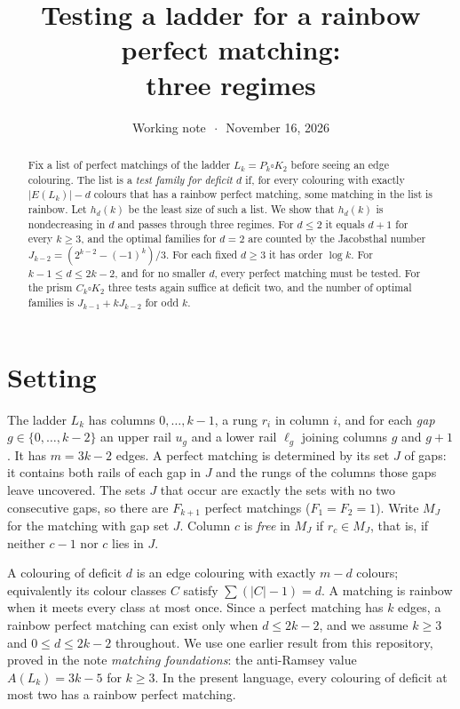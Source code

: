 \documentclass[11pt]{article}
\title{\LARGE\bfseries Testing a ladder for a rainbow perfect matching:\\ three regimes}
\author{}
\date{Working note \(\,\cdot\,\) November 16, 2026}
\theoremstyle{remark}
\begin{document}
\maketitle

\begin{abstract}\noindent
Fix a list of perfect matchings of the ladder \(L_k=P_k\square K_2\) before
seeing an edge colouring. The list is a \emph{test family for deficit \(d\)}
if, for every colouring with exactly \(|E(L_k)|-d\) colours that has a
rainbow perfect matching, some matching in the list is rainbow. Let
\(h_d(k)\) be the least size of such a list. We show that \(h_d(k)\) is
nondecreasing in \(d\) and passes through three regimes. For \(d\le 2\) it
equals \(d+1\) for every \(k\ge3\), and the optimal families for \(d=2\) are
counted by the Jacobsthal number \(J_{k-2}=(2^{k-2}-(-1)^{k})/3\). For each
fixed \(d\ge3\) it has order \(\log k\). For \(k-1\le d\le 2k-2\), and for no
smaller \(d\), every perfect matching must be tested. For the prism
\(C_k\square K_2\) three tests again suffice at deficit two, and the number
of optimal families is \(J_{k-1}+kJ_{k-2}\) for odd \(k\).
\end{abstract}

\section{Setting}
The ladder \(L_k\) has columns \(0,\dots,k-1\), a rung \(r_i\) in column
\(i\), and for each \emph{gap} \(g\in\{0,\dots,k-2\}\) an upper rail \(u_g\)
and a lower rail \(\ell_g\) joining columns \(g\) and \(g+1\). It has
\(m=3k-2\) edges. A perfect matching is determined by its set \(J\) of gaps:
it contains both rails of each gap in \(J\) and the rungs of the columns
those gaps leave uncovered. The sets \(J\) that occur are exactly the sets
with no two consecutive gaps, so there are \(F_{k+1}\) perfect matchings
(\(F_1=F_2=1\)). Write \(M_J\) for the matching with gap set \(J\). Column
\(c\) is \emph{free} in \(M_J\) if \(r_c\in M_J\), that is, if neither
\(c-1\) nor \(c\) lies in \(J\).

A colouring of deficit \(d\) is an edge colouring with exactly \(m-d\)
colours; equivalently its colour classes \(C\) satisfy \(\sum(|C|-1)=d\). A
matching is rainbow when it meets every class at most once. Since a perfect
matching has \(k\) edges, a rainbow perfect matching can exist only when
\(d\le 2k-2\), and we assume \(k\ge3\) and \(0\le d\le 2k-2\) throughout. We
use one earlier result from this repository, proved in the note
\emph{matching foundations}: the anti-Ramsey value \(A(L_k)=3k-5\) for
\(k\ge3\). In the present language, every colouring of deficit at most two
has a rainbow perfect matching.
\end{document}
